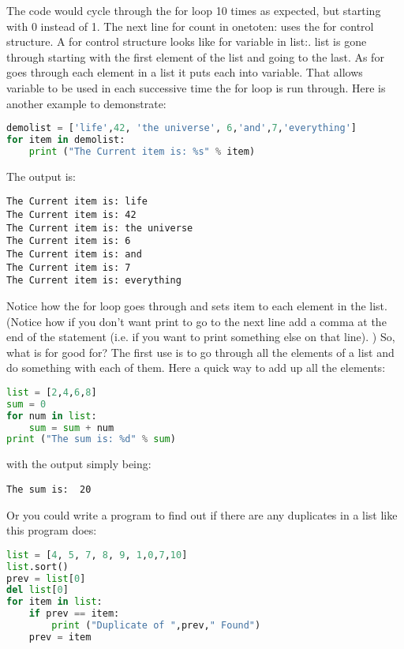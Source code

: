 The code would cycle through the for loop 10 times as expected, but starting
with 0 instead of 1.  The next line for count in onetoten: uses the for control
structure. A for control structure looks like for variable in list:. list is
gone through starting with the first element of the list and going to the last.
As for goes through each element in a list it puts each into variable. That
allows variable to be used in each successive time the for loop is run through.
Here is another example to demonstrate:
\lstset{basicstyle=\scriptsize, numbers=left, captionpos=b, tabsize=4}
\begin{lstlisting}[caption=For Loop List 1,language={Python},
xleftmargin=15pt, label=lst:forlooplist1]
demolist = ['life',42, 'the universe', 6,'and',7,'everything']
for item in demolist:
    print ("The Current item is: %s" % item)
\end{lstlisting}

The output is:
\scriptsize
\begin{verbatim}
The Current item is: life
The Current item is: 42
The Current item is: the universe
The Current item is: 6
The Current item is: and
The Current item is: 7
The Current item is: everything
\end{verbatim}
\normalsize

Notice how the for loop goes through and sets item to each element in the list.
(Notice how if you don't want print to go to the next line add a comma at the
end of the statement (i.e. if you want to print something else on that line). )
So, what is for good for? The first use is to go through all the elements of a
list and do something with each of them. Here a quick way to add up all the
elements:

\lstset{basicstyle=\scriptsize, numbers=left, captionpos=b, tabsize=4}
\begin{lstlisting}[caption=For Loop List 2,language={Python},
xleftmargin=15pt, label=lst:forlooplist2]
list = [2,4,6,8]
sum = 0
for num in list:
    sum = sum + num
print ("The sum is: %d" % sum)
\end{lstlisting}

with the output simply being:
\scriptsize
\begin{verbatim}
The sum is:  20
\end{verbatim}
\normalsize

Or you could write a program to find out if there are any duplicates in a list like this program does:
\lstset{basicstyle=\scriptsize, numbers=left, captionpos=b, tabsize=4}
\begin{lstlisting}[caption=For Loop List 3,language={Python},
xleftmargin=15pt, label=lst:forlooplist3]
list = [4, 5, 7, 8, 9, 1,0,7,10]
list.sort()
prev = list[0]
del list[0]
for item in list:
    if prev == item:
        print ("Duplicate of ",prev," Found")
    prev = item
\end{lstlisting}

